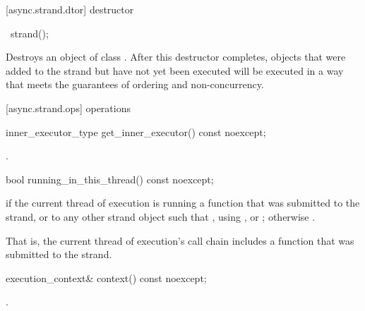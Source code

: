 [async.strand.dtor]{ destructor}

%
\begin{itemdecl}
~strand();
\end{itemdecl}

\begin{itemdescr}
\pnum
\effects Destroys an object of class . After this destructor completes, objects that were added to the strand but have not yet been executed will be executed in a way that meets the guarantees of ordering and non-concurrency.
\end{itemdescr}



[async.strand.ops]{ operations}

%
\begin{itemdecl}
inner_executor_type get_inner_executor() const noexcept;
\end{itemdecl}

\begin{itemdescr}
\pnum
\returns {}.
\end{itemdescr}

%
\begin{itemdecl}
bool running_in_this_thread() const noexcept;
\end{itemdecl}

\begin{itemdescr}
\pnum
\returns {} if the current thread of execution is running a function that was submitted to the strand, or to any other strand object  such that , using ,  or ; otherwise . \begin{note} That is, the current thread of execution's call chain includes a function that was submitted to the strand. \end{note}
\end{itemdescr}

%
\begin{itemdecl}
execution_context& context() const noexcept;
\end{itemdecl}

\begin{itemdescr}
\pnum
\returns {}.
\end{itemdescr}

